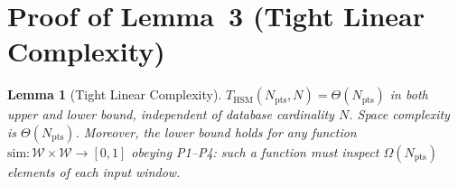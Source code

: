 \documentclass[10pt,twocolumn,a4paper]{article}
\newtheorem{lemma}{Lemma}
\newcommand{\Npts}{N_{\mathrm{pts}}}
\begin{document}
\section{Proof of Lemma~3 (Tight Linear Complexity)}

\begin{lemma}[Tight Linear Complexity]
$T_{\mathrm{HSM}}(\Npts,N)=\Theta(\Npts)$ in both upper and lower
bound, independent of database cardinality $N$. Space complexity is
$\Theta(\Npts)$. Moreover, the lower bound holds for any function
$\mathrm{sim}:\mathcal{W}\!\times\!\mathcal{W}\!\to\![0,1]$ obeying
P1--P4: such a function must inspect $\Omega(\Npts)$ elements of each
input window.
\end{lemma}
\end{document}
